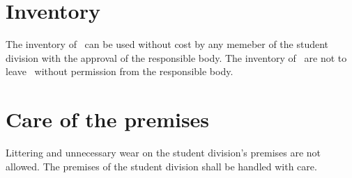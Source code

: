\documentclass[11pt, includeaddress]{classes/cthit_en}
\begin{document}



\section{Inventory}
The inventory of \THECLOUD\ can be used without cost by any memeber of the student division with the approval of the responsible body.
The inventory of \THECLOUD\ are not to leave \THECLOUD\ without permission from the responsible body.

\section{Care of the premises}
Littering and unnecessary wear on the student division's premises are not allowed.
The premises of the student division shall be handled with care.
\end{document}
